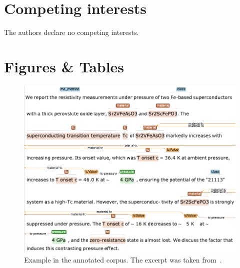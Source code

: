 \documentclass[fleqn,10pt]{wlscirep}
\begin{document}
\section*{Competing interests} 

The authors declare no competing interests.

\section*{Figures \& Tables}

\begin{figure}[ht]
  \centering
  \includegraphics[width=\linewidth]{example-annotated-corpus-postprocess.png}
  \caption{Example in the annotated corpus. The excerpt was taken from~\cite{Kotegawa2009ContrastingPE}.}
  \label{fig:example-annotations-and-links}
\end{figure}

\end{document}
